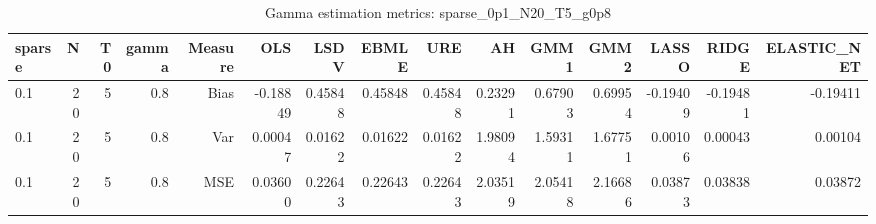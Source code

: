\begin{table}[!htbp]\centering
\caption{Gamma estimation metrics: sparse_0p1_N20_T5_g0p8}
\label{tab:table1_sparse_0p1_N20_T5_g0p8}
\begin{tabular}{lrrrrrrrrrrrrrr}
\hline
sparse & N & T0 & gamma & Measure & OLS & LSDV & EBMLE & URE & AH & GMM1 & GMM2 & LASSO & RIDGE & ELASTIC_NET \\
\hline
0.1 & 20 & 5 & 0.8 & Bias & -0.18849 & 0.45848 & 0.45848 & 0.45848 & 0.23291 & 0.67903 & 0.69954 & -0.19409 & -0.19481 & -0.19411 \\
0.1 & 20 & 5 & 0.8 & Var & 0.00047 & 0.01622 & 0.01622 & 0.01622 & 1.98094 & 1.59311 & 1.67751 & 0.00106 & 0.00043 & 0.00104 \\
0.1 & 20 & 5 & 0.8 & MSE & 0.03600 & 0.22643 & 0.22643 & 0.22643 & 2.03519 & 2.05418 & 2.16686 & 0.03873 & 0.03838 & 0.03872 \\
\hline
\end{tabular}
\end{table}

